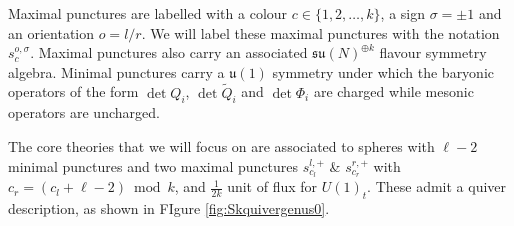 \documentclass[main.tex]{subfiles}
\begin{document}
Maximal punctures are labelled with a colour $c\in \{1,2,\dots,k\}$, a sign $\sigma=\pm1$ and an orientation $o=l/r$.  We will label these maximal punctures with the notation $s_{c}^{o,\sigma}$.  Maximal punctures also carry an associated $\mathfrak{su}(N)^{\oplus k}$ flavour symmetry algebra.  Minimal punctures carry a $\mathfrak{u}(1)$ symmetry under which the baryonic operators of the form $\det Q_i$, $\det \widetilde{Q}_i$ and $\det\Phi_i$ are charged while mesonic operators are uncharged.

The core theories that we will focus on are associated to spheres with $\ell-2$ minimal punctures and two maximal punctures $s_{c_l}^{l,+}$ \& $s_{c_r}^{r,+}$  with $c_r=(c_l+\ell-2)\bmod k$, and $\frac{1}{2k}$ unit of flux for $U(1)_t$.  These admit a quiver description, as shown in FIgure \ref{fig:Skquivergenus0}.
\end{document}
